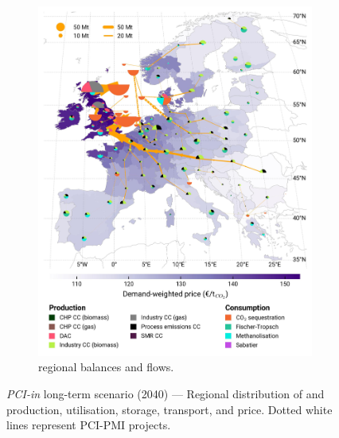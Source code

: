 \documentclass[final,5p,times,twocolumn,sort&compress]{elsarticle}
\begin{document}
\begin{figure}[htbp]
\begin{subfigure}[t]{0.49\textwidth}
      \includegraphics[width=1\textwidth]{maps/pcipmi-national-international-expansion/base_s_adm___2040-balance_map_co2_stored} 
      \vspace{-0.7cm}
      \caption{ regional balances and flows.}
      \label{fig:PCI-in_lt_2040_co2}
  \end{subfigure}
  \caption{\textit{PCI-in} long-term scenario (2040) --- Regional distribution of  and  production, utilisation, storage, transport, and price. Dotted white lines represent PCI-PMI projects.}
  \label{fig:PCI-in_lt_2040}
\end{figure}
\end{document}

